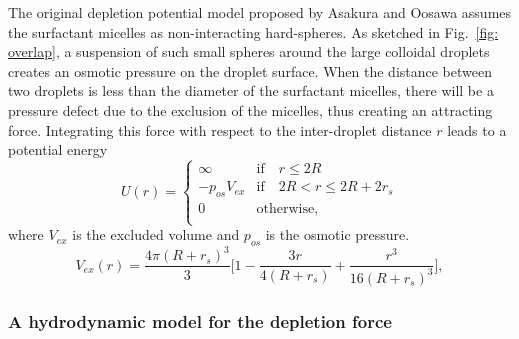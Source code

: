 The original depletion potential model proposed by Asakura and Oosawa \cite{Asakura_1958} assumes the surfactant micelles as non-interacting hard-spheres. As sketched in Fig.\ \ref{fig: overlap}, a suspension of such small spheres around the large colloidal droplets creates an osmotic pressure on the droplet surface. When the distance between two droplets is less than the diameter of the surfactant micelles, there will be a pressure defect due to the exclusion of the micelles, thus creating an attracting force. Integrating this force with respect to the inter-droplet distance $r$ leads to a potential energy
\begin{equation}
    U(r)=
    \begin{cases}
        \infty & \textrm{if} \quad r \leqslant 2R \\
        - p_{os}V_{ex} & \textrm{if} \quad 2R < r \leqslant 2R+2r_s  \\
        0 \quad & \textrm{otherwise}, \\
    \end{cases}
    \label{pot}
\end{equation}
where $V_{ex}$ is the excluded volume and $p_{os}$ is the osmotic pressure. 
\begin{equation}
    V_{ex}(r) = \frac{4\pi (R+r_s)^3}{3}\bigg[ 1- \frac{3r}{4(R+r_s)}+\frac{r^3}{16(R+r_s)^3} \bigg],
    \label{pot V}
\end{equation}



\subsubsection{A hydrodynamic model for the depletion force}

